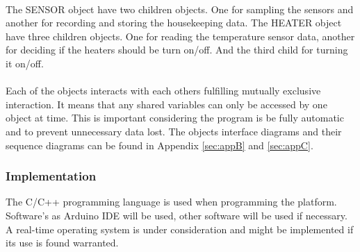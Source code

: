 \begin{enumerate}[label=(\alph*)]
\\
The SENSOR object have two children objects. One for sampling the sensors and another for recording and storing the housekeeping data. The HEATER object have three children objects. One for reading the temperature sensor data, another for deciding if the heaters should be turn on/off. And the third child for turning it on/off.\\ 
\\
Each of the objects interacts with each others fulfilling mutually exclusive interaction. It means that any shared variables can only be accessed by one object at time. This is important considering the program is be fully automatic and to prevent unnecessary data lost. The objects interface diagrams and their sequence diagrams can be found in Appendix \ref{sec:appB} and \ref{sec:appC}.
\end{enumerate}
\subsubsection{Implementation}
The C/C++ programming language is used when programming the platform. Software's as Arduino IDE will be used, other software will be used if necessary. A real-time operating system is under consideration and might be implemented if its use is found warranted. 


\raggedbottom